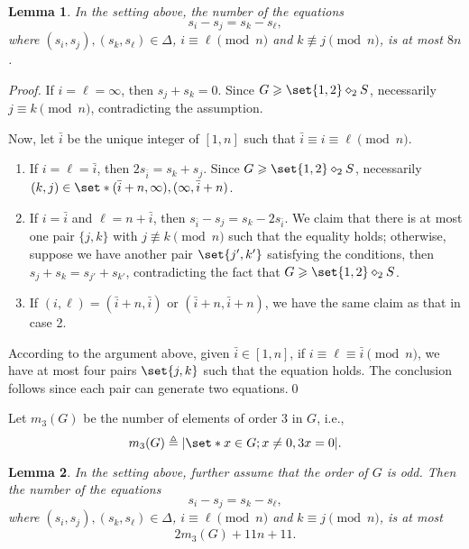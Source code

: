 \documentclass[sort&compress]{elsarticle}
\DeclarePairedDelimiter\abs{\lvert}{\rvert}
\newcommand{\bai}{\bar{i}}
\renewcommand{\geq}{\geqslant}
\newtheorem{lemma}{Lemma}
\newcommand{\eqdef}{\triangleq}
\newcommand{\splt}{\diamond}
\begin{document}
  \begin{lemma}\label{lm:t=2-kp=2-difference1}
    In the setting above, the number of the equations
    \[s_i-s_j=s_k-s_\ell,\]
    where $(s_i,s_j),(s_k,s_\ell) \in \Delta$, $i\equiv \ell \pmod{n}$ and
    $k\not \equiv j\pmod{n}$, is at most $8n$.
  \end{lemma}


  \begin{proof}
    If $i=\ell=\infty$, then $s_j+s_k=0$. Since $G \geq \set{1,2}
    \splt_2 S$, necessarily $j\equiv k \pmod{n}$, contradicting the
    assumption.
    
    Now, let $\bai$ be the unique integer of $[1,n]$ such that
    $\bai\equiv i \equiv \ell \pmod{n}$.
    \begin{enumerate}
    \item
      If $i=\ell=\bai$, then $2s_{\bai}=s_k+s_j$. Since $G \geq
      \set{1,2} \splt_2 S$, necessarily $(k,j)\in \set*{(\bai+n,\infty),(\infty,\bai+n)}$.
    \item
      If $i=\bai$ and $\ell=n+\bai$, then
      $s_{\bai}-s_j=s_k-2s_{\bai}$. We claim that there is at most one
      pair $\{j,k\}$ with $j\not \equiv k \pmod{n}$ such that the
      equality holds; otherwise, suppose we have another pair
      $\set{j',k'}$ satisfying the conditions, then
      $s_j+s_k=s_{j'}+s_{k'}$, contradicting the fact that $G \geq
      \set{1,2} \splt_2 S$.
    \item
      If $(i,\ell)=(\bai+n,\bai)$ or $(\bai+n,\bai+n)$, we have the
      same claim as that in case 2.
    \end{enumerate}
    According to the argument above, given $\bai \in [1,n]$, if
    $i\equiv \ell\equiv \bai \pmod{n}$, we have at most four pairs
    $\set{j,k}$ such that the equation holds. The conclusion follows
    since each pair can generate two equations.\qed
  \end{proof}

  Let $m_3(G)$ be the number of elements of order $3$ in $G$, i.e.,
  \[m_3(G)\eqdef  \abs*{\set*{x\in G ; x\neq 0, 3x=0}}.\]

  \begin{lemma}\label{lm:t=2-kp=2-difference2}
    In the setting above, further assume that the order of $G$ is odd.
    Then the number of the equations
    \[s_i-s_j=s_k-s_\ell,\]
    where $(s_i,s_j),(s_k,s_\ell) \in \Delta$, $i\equiv \ell \pmod{n}$ and
    $k \equiv j\pmod{n}$, is at most
    \[2m_3(G)+11n+11.\]
  \end{lemma}
\end{document}

